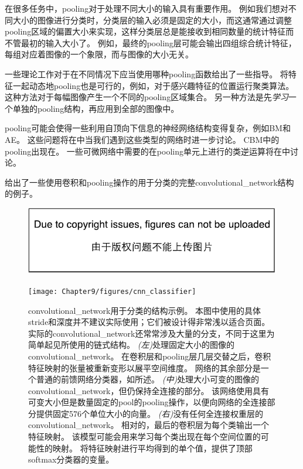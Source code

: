  
在很多任务中，\gls{pooling}对于处理不同大小的输入具有重要作用。
例如我们想对不同大小的图像进行分类时，分类层的输入必须是固定的大小，而这通常通过调整\gls{pooling}区域的偏置大小来实现，这样分类层总是能接收到相同数量的统计特征而不管最初的输入大小了。
例如，最终的\gls{pooling}层可能会输出四组综合统计特征，每组对应着图像的一个象限，而与图像的大小无关。

一些理论工作对于在不同情况下应当使用哪种\gls{pooling}函数给出了一些指导\citep{boureau-icml-10}。
将特征一起动态地\gls{pooling}也是可行的，例如，对于感兴趣特征的位置运行聚类算法\citep{boureau-iccv-11}。
这种方法对于每幅图像产生一个不同的\gls{pooling}区域集合。
另一种方法是先\emph{学习}一个单独的\gls{pooling}结构，再应用到全部的图像中\citep{jia2012beyond}。

\gls{pooling}可能会使得一些利用自顶向下信息的神经网络结构变得复杂，例如\gls{BM}和\gls{AE}。
这些问题将在中当我们遇到这些类型的网络时进一步讨论。
\gls{CBM}中的\gls{pooling}出现在。
一些可微网络中需要的在\gls{pooling}单元上进行的类逆运算将在中讨论。

给出了一些使用卷积和\gls{pooling}操作的用于分类的完整\gls{convolutional_network}结构的例子。
\begin{figure}[!htb]
\ifOpenSource
\centerline{\includegraphics{figure.pdf}}
\else
\centerline{\texttt{[image: Chapter9/figures/cnn\_classifier]}}
\fi
\caption{\gls{convolutional_network}用于分类的结构示例。
本图中使用的具体\gls{stride}和深度并不建议实际使用；它们被设计得非常浅以适合页面。
实际的\gls{convolutional_network}还常常涉及大量的分支，不同于这里为简单起见所使用的链式结构。
\emph{(左)}处理固定大小的图像的\gls{convolutional_network}。
在卷积层和\gls{pooling}层几层交替之后，卷积特征映射的张量被重新变形以展平空间维度。
网络的其余部分是一个普通的前馈网络分类器，如所述。
\emph{(中)}处理大小可变的图像的\gls{convolutional_network}，但仍保持全连接的部分。
该网络使用具有可变大小但是数量固定的\gls{pool}的\gls{pooling}操作，以便向网络的全连接部分提供固定576个单位大小的向量。 
\emph{(右)}没有任何全连接权重层的\gls{convolutional_network}。
相对的，最后的卷积层为每个类输出一个特征映射。
该模型可能会用来学习每个类出现在每个空间位置的可能性的映射。
将特征映射进行平均得到的单个值，提供了顶部softmax分类器的变量。}
\label{fig:chap9_cnn_classifier}
\end{figure}

